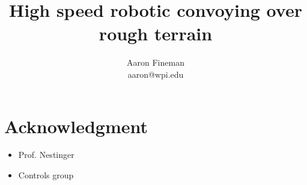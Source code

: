 \documentclass{report}
\begin{document}
\title{High speed robotic convoying over rough terrain}
\author{Aaron Fineman\\aaron@wpi.edu}
\maketitle



\tableofcontents









\chapter*{Acknowledgment}
\begin{itemize}
\item Prof. Nestinger
\item Controls group
\end{itemize}





\appendix

\end{document}
